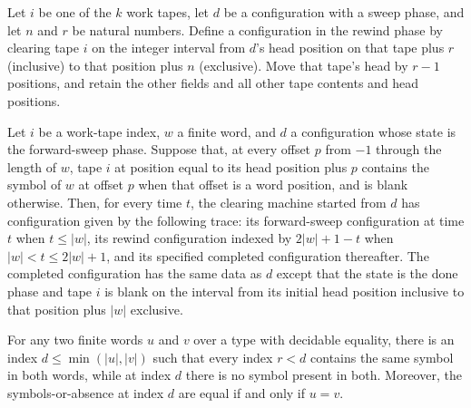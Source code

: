 \begin{definition}
\label{Turing.catalogClearR}
\leanok
{}
Let $i$ be one of the $k$ work tapes, let $d$ be a configuration with a sweep phase, and
let $n$ and $r$ be natural numbers. Define a configuration in the rewind phase by
clearing tape $i$ on the integer interval from $d$'s head position on that tape plus $r$
(inclusive) to that position plus $n$ (exclusive). Move that tape's head by $r-1$
positions, and retain the other fields and all other tape contents and head positions.
\end{definition}

\begin{lemma}
\label{Turing.catalog_clear_trace}
\leanok
{}
Let $i$ be a work-tape index, $w$ a finite word, and $d$ a configuration whose state is
the forward-sweep phase. Suppose that, at every offset $p$ from $-1$ through the length
of $w$, tape $i$ at position equal to its head position plus $p$ contains the symbol of
$w$ at offset $p$ when that offset is a word position, and is blank otherwise. Then, for
every time $t$, the clearing machine started from $d$ has configuration given by the
following trace: its forward-sweep configuration at time $t$ when $t\le |w|$, its rewind
configuration indexed by $2|w|+1-t$ when $|w|<t\le 2|w|+1$, and its specified completed
configuration thereafter. The completed configuration has the same data as $d$ except
that the state is the done phase and tape $i$ is blank on the interval from its initial
head position inclusive to that position plus $|w|$ exclusive.
\end{lemma}

\begin{lemma}
\label{Turing.catalog_compare_stop}
\leanok
{}
For any two finite words $u$ and $v$ over a type with decidable equality, there is an
index $d\le \min(|u|,|v|)$ such that every index $r<d$ contains the same symbol in both
words, while at index $d$ there is no symbol present in both. Moreover, the
symbols-or-absence at index $d$ are equal if and only if $u=v$.
\end{lemma}


